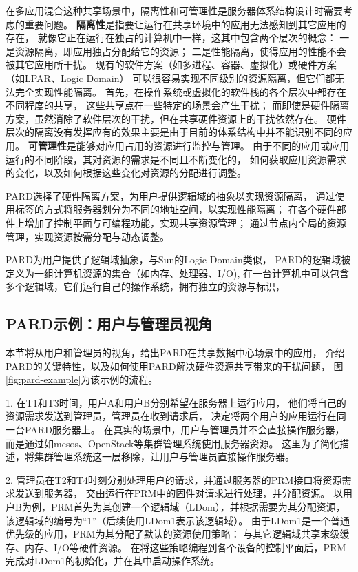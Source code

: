 在多应用混合这种共享场景中，隔离性和可管理性是服务器体系结构设计时需要考虑的重要问题。
\textbf{隔离性}是指要让运行在共享环境中的应用无法感知到其它应用的存在，
就像它正在运行在独占的计算机中一样，这其中包含两个层次的概念：
一是资源隔离，即应用独占分配给它的资源；
二是性能隔离，使得应用的性能不会被其它应用所干扰。
现有的软件方案（如多进程、容器、虚拟化）或硬件方案（如LPAR、Logic Domain）
可以很容易实现不同级别的资源隔离，但它们都无法完全实现性能隔离。
首先，在操作系统或虚拟化的软件栈的各个层次中都存在不同程度的共享，
这些共享点在一些特定的场景会产生干扰；
而即使是硬件隔离方案，虽然消除了软件层次的干扰，但在共享硬件资源上的干扰依然存在。
硬件层次的隔离没有发挥应有的效果主要是由于目前的体系结构中并不能识别不同的应用。
\textbf{可管理性}是能够对应用占用的资源进行监控与管理。
由于不同的应用或应用运行的不同阶段，其对资源的需求是不同且不断变化的，
如何获取应用资源需求的变化，以及如何根据这些变化对资源的分配进行调整。

PARD选择了硬件隔离方案，为用户提供逻辑域的抽象以实现资源隔离，
通过使用标签的方式将服务器划分为不同的地址空间，以实现性能隔离；
在各个硬件部件上增加了控制平面与可编程功能，实现共享资源管理；
通过节点内全局的资源管理，实现资源按需分配与动态调整。

PARD为用户提供了逻辑域抽象，与Sun的Logic Domain\cite{}类似，
PARD的逻辑域被定义为一组计算机资源的集合（如内存、处理器、I/O),
在一台计算机中可以包含多个逻辑域，它们运行自己的操作系统，拥有独立的资源与标识，


\subsection{PARD示例：用户与管理员视角}

本节将从用户和管理员的视角，给出PARD在共享数据中心场景中的应用，
介绍PARD的关键特性，以及如何使用PARD解决硬件资源共享带来的干扰问题，
图\ref{fig:pard-example}为该示例的流程。

1. 在T1和T3时间，用户A和用户B分别希望在服务器上运行应用，
他们将自己的资源需求发送到管理员，管理员在收到请求后，
决定将两个用户的应用运行在同一台PARD服务器上。
在真实的场景中，用户与管理员并不会直接操作服务器，
而是通过如mesos\cite{}、OpenStack\cite{}等集群管理系统使用服务器资源。
这里为了简化描述，将集群管理系统这一层移除，让用户与管理员直接操作服务器。

2. 管理员在T2和T4时刻分别处理用户的请求，并通过服务器的PRM接口将资源需求发送到服务器，
交由运行在PRM中的固件对请求进行处理，并分配资源。
以用户B为例，PRM首先为其创建一个逻辑域（LDom），并根据需要为其分配资源，
该逻辑域的编号为“1”（后续使用LDom1表示该逻辑域）。
由于LDom1是一个普通优先级的应用，PRM为其分配了默认的资源使用策略：
与其它逻辑域共享末级缓存、内存、I/O等硬件资源。
在将这些策略编程到各个设备的控制平面后，PRM完成对LDom1的初始化，并在其中启动操作系统。

